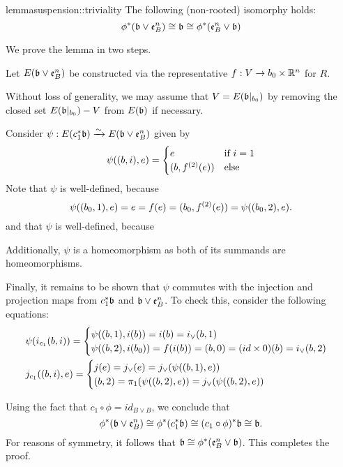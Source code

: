 \begin{mystatement}{lemma}{suspension::triviality}
    The following (non-rooted) isomorphy holds:
    \[ \ind{\phi}(\bb \vee \be{B}) \cong \bb \cong \ind{\phi}(\be{B} \vee \bb) \]
\end{mystatement}

\begin{myproof}
    We prove the lemma in two steps.
    \begin{steps}
        
        Let $E(\bb \vee \be{B})$ be constructed via 
        the representative $f: V \to b_0 \cross \R^n$ for $R$.

        Without loss of generality, we may assume that
        $V = E(\bbb)$ by removing the closed set $E(\bbb) - V$ from $E(\bb)$ if necessary.

        Consider $\psi: E(\ind{c_1}\bb) \isomto E(\bb \vee \be{B})$ given by
        \[ \psi((b, i), e) = \case{e}{(b, \snd{f}(e))}{i = 1} \]
        Note that $\psi$ is well-defined, because
        \[ \psi((b_0, 1), e) = e = f(e) = (b_0, \snd{f}(e)) = \psi((b_0, 2), e). \]
        and that $\psi$ is well-defined, because

        Additionally, $\psi$ is a homeomorphism as both of its summands are homeomorphisms.

        Finally, it remains to be shown that $\psi$
        commutes with the injection and projection maps from $\ind{c_1}\bb$ and $\bb \vee \be{B}$.
        To check this, consider the following equations:
        \begin{align}
            &\psi(i_{c_1}(b, i)) = \casenif{\psi((b, 1), i(b)) = i(b) = i_\vee(b, 1)}{\psi((b, 2), i(b_0)) = f(i(b)) = (b, 0) = (id \cross 0)(b) = i_\vee(b, 2)} \\
            &j_{c_1}((b, i), e) = \casenif{j(e) = j_\vee(e) = j_\vee(\psi((b, 1), e))}{(b, 2) = \pi_1(\psi((b, 2), e)) = j_\vee(\psi((b, 2), e))}
        \end{align}
        

        Using the fact that $c_1 \circ \phi = id_{B \vee B}$, we conclude that
        \[ \ind{\phi}(\bb \vee \be{B}) \cong \ind{\phi}(\ind{c_1}\bb) \cong \ind{(c_1 \circ \phi)}\bb \cong \bb. \]
        For reasons of symmetry, it follows that $\bb \cong \ind{\phi}(\be{B} \vee \bb)$.
        This completes the proof.
    \end{steps}
\end{myproof}